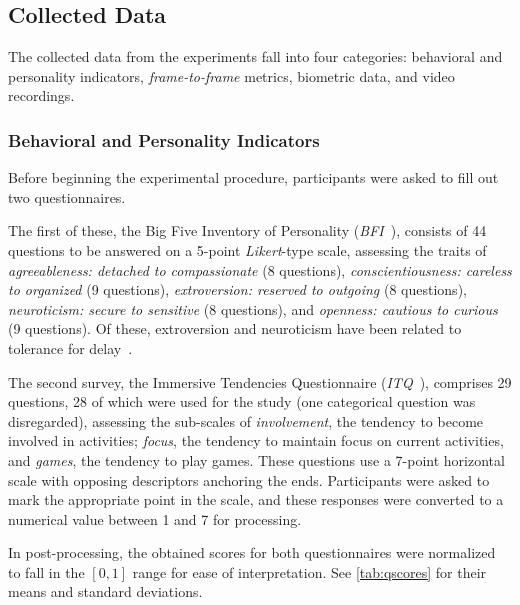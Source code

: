 \documentclass[10pt,letterpaper]{article}
\providecommand{\DIFdelbegin}{\protect\color{red}} %
\providecommand{\DIFdelend}{\protect\color{black}} %
\newcommand{\DIFscaledelfig}{0.5}
\newlength{\DIFdelgraphicswidth} %
\newlength{\DIFdelgraphicsheight} %
\newcommand{\DIFdelincludegraphics}[2][]{%
\sbox{\DIFdelgraphicsbox}{\DIFOincludegraphics[#1]{#2}}%
\settoboxwidth{\DIFdelgraphicswidth}{\DIFdelgraphicsbox} %
\settoboxtotalheight{\DIFdelgraphicsheight}{\DIFdelgraphicsbox} %
\scalebox{\DIFscaledelfig}{%
\parbox[b]{\DIFdelgraphicswidth}{\usebox{\DIFdelgraphicsbox}\\[-\baselineskip] \rule{\DIFdelgraphicswidth}{0em}}\llap{\resizebox{\DIFdelgraphicswidth}{\DIFdelgraphicsheight}{%
\setlength{\unitlength}{\DIFdelgraphicswidth}%
\begin{picture}(1,1)%
\thicklines\linethickness{2pt} %
{\color[rgb]{1,0,0}\put(0,0){\framebox(1,1){}}}%
{\color[rgb]{1,0,0}\put(0,0){\line( 1,1){1}}}%
{\color[rgb]{1,0,0}\put(0,1){\line(1,-1){1}}}%
\end{picture}%
}\hspace*{3pt}}} %
} %
\DeclareRobustCommand{\DIFdelbegin}{\DIFOdelbegin \let\includegraphics\DIFdelincludegraphics} %
\DeclareRobustCommand{\DIFdelend}{\DIFOaddend \let\includegraphics\DIFOincludegraphics} %
\begin{document}
\DIFdelbegin %

\DIFdelend \subsection{Collected Data}

The collected data from the experiments fall into four categories: behavioral and personality indicators, \emph{frame-to-frame} metrics, biometric data, and video recordings.

\subsubsection{Behavioral and Personality Indicators}

Before beginning the experimental procedure, participants were asked to fill out two questionnaires.

The first of these, the Big Five Inventory of Personality (\emph{BFI}~\cite{john1999:bfi}), consists of 44 questions to be answered on a 5-point \emph{Likert}-type scale, assessing the traits of \emph{agreeableness: detached to compassionate} (8 questions), \emph{conscientiousness: careless to organized} (9 questions), \emph{extroversion: reserved to outgoing} (8 questions), \emph{neuroticism: secure to sensitive} (8 questions), and \emph{openness: cautious to curious} (9 questions).
Of these, extroversion and neuroticism have been related to tolerance for delay~\cite{hirsh2008delay}. 

The second survey, the Immersive Tendencies Questionnaire (\emph{ITQ}~\cite{witmer1998:itq}), comprises 29 questions, 28 of which were used for the study (one categorical question was disregarded), assessing the sub-scales of \emph{involvement}, the tendency to become involved in activities; \emph{focus}, the tendency to maintain focus on current activities, and \emph{games}, the tendency to play games.
These questions use a 7-point horizontal scale  with opposing descriptors anchoring  the ends.
Participants were asked to mark the appropriate point in the scale, and these responses were converted to a numerical value between 1 and 7 for processing. 

In post-processing, the obtained scores for both questionnaires were normalized to fall in the \( [0, 1] \) range for ease of interpretation. 
See \cref{tab:qscores} for their means and standard deviations.
\end{document}
